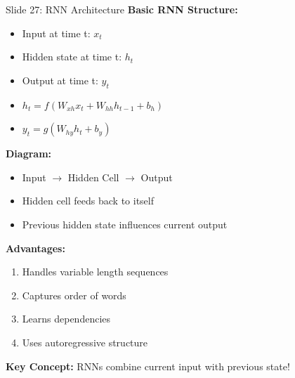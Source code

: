 \documentclass[8pt]{beamer}
\begin{document}
	\begin{frame}{Slide 27: RNN Architecture}
		\fontsize{6.5}{7.5}\selectfont
		\textbf{Basic RNN Structure:}
		\begin{itemize}
			\item Input at time t: $x_t$
			\item Hidden state at time t: $h_t$
			\item Output at time t: $y_t$
			\item $h_t = f(W_{xh}x_t + W_{hh}h_{t-1} + b_h)$
			\item $y_t = g(W_{hy}h_t + b_y)$
		\end{itemize}
		
		\vspace{0.1cm}
		\textbf{Diagram:}
		\begin{itemize}
			\item Input $\to$ Hidden Cell $\to$ Output
			\item Hidden cell feeds back to itself
			\item Previous hidden state influences current output
		\end{itemize}
		
		\vspace{0.1cm}
		\textbf{Advantages:}
		\begin{enumerate}
			\item Handles variable length sequences
			\item Captures order of words
			\item Learns dependencies
			\item Uses autoregressive structure
		\end{enumerate}
		
		\textcolor{myblue}{\textbf{Key Concept:}} RNNs combine current input with previous state!
	\end{frame}
	
\end{document}
